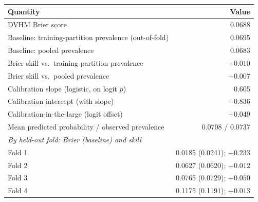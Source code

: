 \begin{tabular}{lr}
\toprule
Quantity & Value \\
\midrule
DVHM Brier score & 0.0688 \\
Baseline: training-partition prevalence (out-of-fold) & 0.0695 \\
Baseline: pooled prevalence & 0.0683 \\
Brier skill vs.\ training-partition prevalence & $+0.010$ \\
Brier skill vs.\ pooled prevalence & $-0.007$ \\
Calibration slope (logistic, on logit $\bar p$) & 0.605 \\
Calibration intercept (with slope) & $-0.836$ \\
Calibration-in-the-large (logit offset) & $+0.049$ \\
Mean predicted probability / observed prevalence & 0.0708 / 0.0737 \\
\midrule
\multicolumn{2}{l}{\emph{By held-out fold: Brier (baseline) and skill}} \\
Fold 1 & 0.0185 (0.0241); $+0.233$ \\
Fold 2 & 0.0627 (0.0620); $-0.012$ \\
Fold 3 & 0.0765 (0.0729); $-0.050$ \\
Fold 4 & 0.1175 (0.1191); $+0.013$ \\
\bottomrule
\end{tabular}
